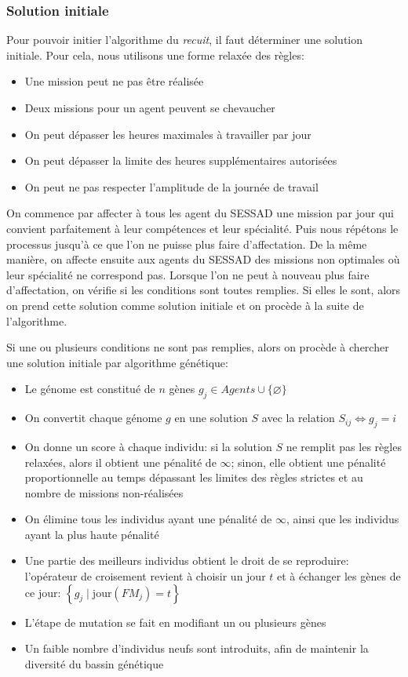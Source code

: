\documentclass[11pt]{article}
\begin{document}
\subsubsection{Solution initiale}

Pour pouvoir initier l'algorithme du \emph{recuit}, il faut déterminer une solution initiale.
Pour cela, nous utilisons une forme relaxée des règles:

\begin{itemize}
    \item Une mission peut ne pas être réalisée
    \item Deux missions pour un agent peuvent se chevaucher
    \item On peut dépasser les heures maximales à travailler par jour
    \item On peut dépasser la limite des heures supplémentaires autorisées
    \item On peut ne pas respecter l'amplitude de la journée de travail
\end{itemize}

On commence par affecter à tous les agent du SESSAD une mission par jour qui convient parfaitement à leur compétences et leur spécialité.
Puis nous répétons le processus jusqu'à ce que l'on ne puisse plus faire d'affectation.
De la même manière, on affecte ensuite aux agents du SESSAD des missions non optimales où leur spécialité ne correspond pas.
Lorsque l'on ne peut à nouveau plus faire d'affectation, on vérifie si les conditions sont toutes remplies.
Si elles le sont, alors on prend cette solution comme solution initiale et on procède à la suite de l'algorithme.

Si une ou plusieurs conditions ne sont pas remplies, alors on procède à chercher une solution initiale par algorithme génétique:

\begin{itemize}
    \item Le génome est constitué de $n$ gènes $g_j \in Agents \cup \{ \varnothing \}$
    \item On convertit chaque génome $g$ en une solution $S$ avec la relation $S_{ij} \Leftrightarrow g_j = i$
    \item On donne un score à chaque individu: si la solution $S$ ne remplit pas les règles relaxées, alors il obtient une pénalité de $\infty$; sinon, elle obtient une pénalité proportionnelle au temps dépassant les limites des règles strictes et au nombre de missions non-réalisées
    \item On élimine tous les individus ayant une pénalité de $\infty$, ainsi que les individus ayant la plus haute pénalité
    \item Une partie des meilleurs individus obtient le droit de se reproduire: l'opérateur de croisement revient à choisir un jour $t$ et à échanger les gènes de ce jour: $\left\{g_j \;|\; \text{jour}(FM_j) = t \right\}$
    \item L'étape de mutation se fait en modifiant un ou plusieurs gènes
    \item Un faible nombre d'individus neufs sont introduits, afin de maintenir la diversité du bassin génétique
\end{itemize}
\end{document}
